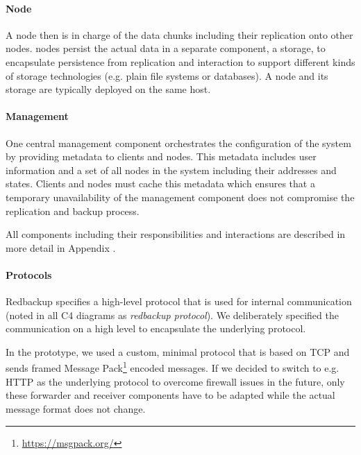 \paragraph{Node}
A \gls{node} then is in charge of the data \glspl{chunk} including their replication onto other \glspl{node}. \Glspl{node} persist the actual data in a separate component, a \gls{storage}, to encapsulate persistence from replication and interaction to support different kinds of storage technologies (e.g. plain file systems or databases). A \gls{node} and its \gls{storage} are typically deployed on the same host.

\paragraph{Management}
One central \gls{management} component orchestrates the configuration of the system by providing metadata to \glspl{client} and \glspl{node}. This metadata includes user information and a set of all \glspl{node} in the system including their addresses and states. Clients and \glspl{node} must cache this metadata which ensures that a temporary unavailability of the \gls{management} component does not compromise the replication and backup process.

All components including their responsibilities and interactions are described in more detail in Appendix .

\paragraph{Protocols} Redbackup specifies a high-level protocol that is used for internal communication (noted in all C4 diagrams as \emph{redbackup protocol}). We deliberately specified the communication on a high level to encapsulate the underlying protocol.

In the prototype, we used a custom, minimal protocol that is based on TCP and sends framed Message Pack\footnote{\url{https://msgpack.org/}} encoded messages. If we decided to switch to e.g. HTTP as the underlying protocol to overcome firewall issues in the future, only these forwarder and receiver components have to be adapted while the actual message format does not change. 

